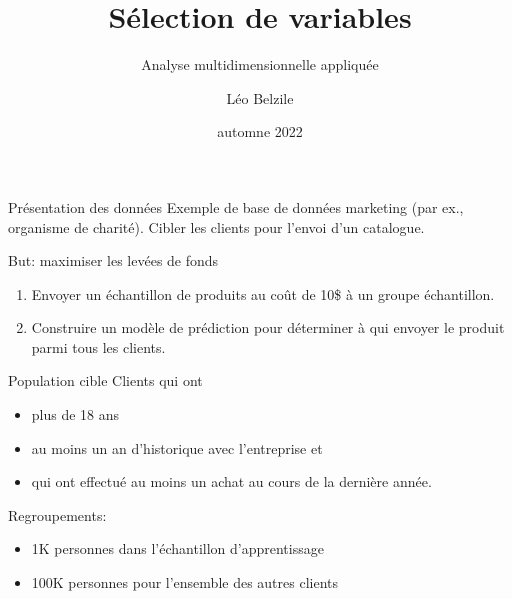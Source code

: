 \documentclass[
  ignorenonframetext,
]{beamer}
\title{Sélection de variables}
\subtitle{Analyse multidimensionnelle appliquée}
\author{Léo Belzile}
\date{automne 2022}
\institute{HEC Montréal}
\providecommand{\tightlist}{%
  \setlength{\itemsep}{0pt}\setlength{\parskip}{0pt}}\usepackage{longtable,booktabs,array}
\begin{document}
\frame{\titlepage}
\ifdefined\Shaded\renewenvironment{Shaded}{\begin{tcolorbox}[borderline west={3pt}{0pt}{shadecolor}, sharp corners, breakable, boxrule=0pt, frame hidden, enhanced, interior hidden]}{\end{tcolorbox}}\fi

\begin{frame}{Présentation des données}
\protect\hypertarget{pruxe9sentation-des-donnuxe9es}{}
Exemple de base de données marketing (par ex., organisme de charité).
Cibler les clients pour l'envoi d'un catalogue.

But: maximiser les levées de fonds

\begin{enumerate}
\tightlist
\item
  Envoyer un échantillon de produits au coût de 10\$ à un groupe
  échantillon.
\item
  Construire un modèle de prédiction pour déterminer à qui envoyer le
  produit parmi tous les clients.
\end{enumerate}
\end{frame}

\begin{frame}{Population cible}
\protect\hypertarget{population-cible}{}
Clients qui ont

\begin{itemize}
\tightlist
\item
  plus de 18 ans
\item
  au moins un an d'historique avec l'entreprise et
\item
  qui ont effectué au moins un achat au cours de la dernière année.
\end{itemize}

Regroupements:

\begin{itemize}
\tightlist
\item
  1K personnes dans l'échantillon d'apprentissage
\item
  100K personnes pour l'ensemble des autres clients
\end{itemize}
\end{frame}
\end{document}
